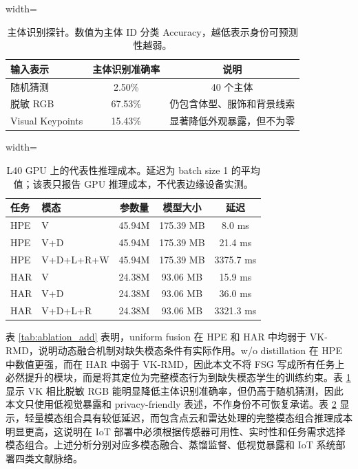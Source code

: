 \documentclass[journal]{IEEEtran}
\begin{document}
\begin{table}[!t]
\centering
\caption{主体识别探针。数值为主体 ID 分类 Accuracy，越低表示身份可预测性越弱。}
\label{tab:privacy_add}
\scriptsize
\begin{adjustbox}{width=\linewidth}
\begin{tabular}{lcc}
\toprule
输入表示 & 主体识别准确率 & 说明 \\
\midrule
随机猜测 & 2.50\% & 40 个主体 \\
脱敏 RGB & 67.53\% & 仍包含体型、服饰和背景线索 \\
Visual Keypoints & 15.43\% & 显著降低外观暴露，但不为零 \\
\bottomrule
\end{tabular}
\end{adjustbox}
\end{table}

\begin{table}[!t]
\centering
\caption{L40 GPU 上的代表性推理成本。延迟为 batch size 1 的平均值；该表只报告 GPU 推理成本，不代表边缘设备实测。}
\label{tab:iot_add}
\scriptsize
\begin{adjustbox}{width=\linewidth}
\begin{tabular}{llccc}
\toprule
任务 & 模态 & 参数量 & 模型大小 & 延迟 \\
\midrule
HPE & V & 45.94M & 175.39 MB & 8.0 ms \\
HPE & V+D & 45.94M & 175.39 MB & 21.4 ms \\
HPE & V+D+L+R+W & 45.94M & 175.39 MB & 3375.7 ms \\
HAR & V & 24.38M & 93.06 MB & 15.9 ms \\
HAR & V+D & 24.38M & 93.06 MB & 36.0 ms \\
HAR & V+D+L+R & 24.38M & 93.06 MB & 3321.3 ms \\
\bottomrule
\end{tabular}
\end{adjustbox}
\end{table}

表 \ref{tab:ablation_add} 表明，uniform fusion 在 HPE 和 HAR 中均弱于 VK-RMD，说明动态融合机制对缺失模态条件有实际作用。w/o distillation 在 HPE 中数值更强，而在 HAR 中弱于 VK-RMD，因此本文不将 FSG 写成所有任务上必然提升的模块，而是将其定位为完整模态行为到缺失模态学生的训练约束。表 \ref{tab:privacy_add} 显示 VK 相比脱敏 RGB 能明显降低主体识别准确率，但仍高于随机猜测，因此本文只使用低视觉暴露和 privacy-friendly 表述，不作身份不可恢复承诺。表 \ref{tab:iot_add} 显示，轻量模态组合具有较低延迟，而包含点云和雷达处理的完整模态组合推理成本明显更高，这说明在 IoT 部署中必须根据传感器可用性、实时性和任务需求选择模态组合。上述分析分别对应多模态融合、蒸馏监督、低视觉暴露和 IoT 系统部署四类文献脉络\cite{sensorFusion,crossModalKD,kd,privacyOptics,lowresDepth,iotSurvey,smartHealthcare,wearableSurvey}。
\end{document}
